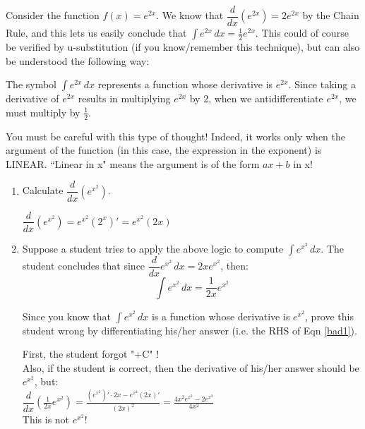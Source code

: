 \documentclass[]{ximera}
\begin{document}
\begin{problem}
Consider the function $f(x)=e^{2x}$.  We know that $\dfrac{d}{dx} \left( e^{2x} \right) = 2 e^{2x}$ by the Chain Rule, and this lets us easily conclude that $\int e^{2x} \, dx = \frac{1}{2} e^{2x}$.  This could of course be verified by u-substitution (if you know/remember this technique), but can also be understood the following way:

The symbol $\int e^{2x} \, dx$ represents a function whose derivative is $e^{2x}$.  Since taking a derivative of $e^{2x}$ results in multiplying $e^{2x}$ by 2, when we antidifferentiate $e^{2x}$, we must multiply by $\frac{1}{2}$.  

You must be careful with this type of thought!  Indeed, it works only when the argument of the function (in this case, the expression in the exponent) is LINEAR.  ``Linear in x" means the argument is of the form $ax+b$ in x!

	\begin{enumerate}
	
	\item  Calculate $\dfrac{d}{dx} \left(e^{x^2} \right) $.
	\begin{freeResponse}
		$\dfrac{d}{dx} \left(e^{x^2} \right) = e^{x^2} \left( 2^x \right)' = e^{x^2} \left( 2x \right)$
	\end{freeResponse}
			
		
	\item Suppose a student tries to apply the above logic to compute $\int e^{x^2} \, dx$.  The student concludes that since $\dfrac{d}{dx} e^{x^2} \, dx = 2x e^{x^2} $, then: 
\begin{equation}
 \int e^{x^2} \, dx = \dfrac{1}{2x} e^{x^2} \label{bad1}
\end{equation}

Since you know that $\int e^{x^2} \, dx$ is a function whose derivative is $e^{x^2}$, prove this student wrong by differentiating his/her answer (i.e. the RHS of Eqn \ref{bad1}).  
	\begin{freeResponse}
	First, the student forgot "+C" ! \\
	Also, if the student is correct, then the derivative of his/her answer should be $e^{x^2}$, but:\\
	$\dfrac{d}{dx} \left( \frac{1}{2x} e^{x^2} \right) = \frac{\left(e^{x^2}\right)' \cdot 2x - e^{x^2} \left( 2x \right)'}{\left( 2x \right)^2} = 
	\frac{4x^2e^{x^2} - 2e^{x^2}}{4x^2}$ \\
	This is not $e^{x^2}$!
	\end{freeResponse}
		

\end{enumerate}
\end{problem}
\end{document}
